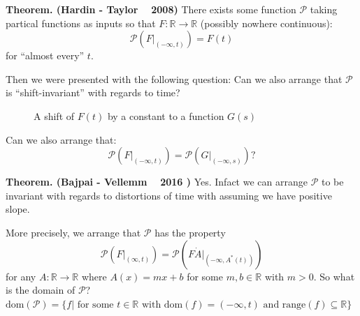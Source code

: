 \documentclass[12pt]{amsart}
\begin{document}
\begin{onehalfspace}
        \noindent\textbf{Theorem. (Hardin - Taylor ~ 2008)} There exists some function $\mathcal{P}$ taking partical
        functions as inputs so that $F:\mathbb{R} \rightarrow \mathbb{R}$ (possibly nowhere continuous):
        \begin{displaymath}
            \mathcal{P}\left(F\big|_{(-\infty,t)}\right) = F(t)
        \end{displaymath}
        for ``almost every'' $t$.

        Then we were presented with the following question: Can we also arrange that $\mathcal{P}$ is ``shift-invariant''
        with regards to time?

        \begin{figure}[!ht]
            \centering
            \caption{A shift of $F(t)$ by a constant to a function $G(s)$}
        \end{figure}

        Can we also arrange that:
        \begin{displaymath}
            \mathcal{P}\left(F\big|_{(-\infty,t)}\right) = \mathcal{P}\left(G\big|_{(-\infty,s)}\right)?
        \end{displaymath}

        \noindent\textbf{Theorem. (Bajpai - Vellemm ~ 2016 )} Yes. Infact we can arrange $\mathcal{P}$ to be invariant
        with regards to distortions of time with assuming we have positive slope.

        More precisely, we arrange that $\mathcal{P}$ has the property
        \begin{displaymath}
            \mathcal{P}\left(F\big|_{(\infty,t)}\right) = \mathcal{P}\left(F \dot A \big|_{(-\infty, A^*(t))}\right)
        \end{displaymath}
        for any $A: \mathbb{R} \rightarrow \mathbb{R}$ where $A(x) = mx+b$ for some $m,b\in\mathbb{R}$ with $m > 0$. So
        what is the domain of $\mathcal{P}$? $\text{dom}(\mathcal{P}) = \{f | \text{ for some } t\in \mathbb{R} \text{ with dom}(f) = (-\infty,t) \text{ and range}(f)\subseteq\mathbb{R}\}$


\end{onehalfspace}
\end{document}
